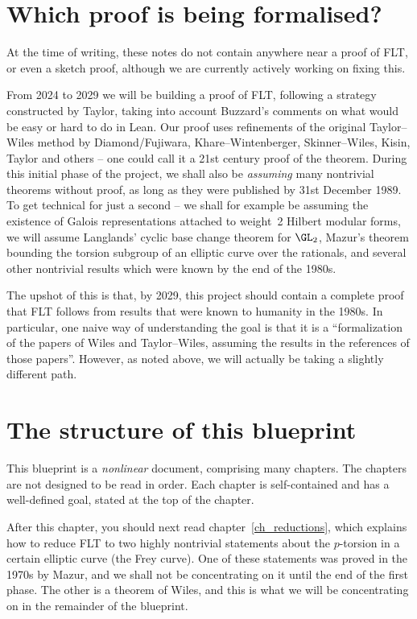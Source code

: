 \section{Which proof is being formalised?}

At the time of writing, these notes do not contain anywhere near a proof of FLT, or even a sketch proof,
although we are currently actively working on fixing this.

From 2024 to 2029 we will be building a proof of FLT, following a strategy
constructed by Taylor, taking into account Buzzard's comments on what would be easy or hard to do
in Lean. Our proof uses refinements of the original Taylor--Wiles method by Diamond/Fujiwara,
Khare--Wintenberger, Skinner--Wiles, Kisin, Taylor and others -- one could call it a 21st century
proof of the theorem. During this initial phase of the project, we shall also be \emph{assuming}
many nontrivial theorems without proof, as long as they were published by 31st December 1989.
To get technical for just a second -- we shall for example be assuming the existence of Galois
representations attached to weight~2 Hilbert modular forms, we will assume Langlands' cyclic base
change theorem for $\GL_2$, Mazur's theorem bounding the torsion subgroup of an elliptic curve over
the rationals, and several other nontrivial results which were known by the end of the 1980s.

The upshot of this is that, by 2029, this project should contain a complete proof that FLT
follows from results that were known to humanity in the 1980s. In particular, one naive
way of understanding the goal is that it is a ``formalization of the papers of Wiles and Taylor--Wiles,
assuming the results in the references of those papers''. However, as noted above, we will actually
be taking a slightly different path.

\section{The structure of this blueprint}

This blueprint is a \emph{nonlinear} document, comprising many chapters. The chapters
are not designed to be read in order. Each chapter is self-contained and has a well-defined goal,
stated at the top of the chapter.

After this chapter, you should next read chapter~\ref{ch_reductions}, which explains how to reduce FLT
to two highly nontrivial statements about the $p$-torsion in a certain elliptic curve (the Frey curve).
One of these statements was proved in the 1970s by Mazur, and we shall not be concentrating on
it until the end of the first phase. The other is a theorem of Wiles, and this is what we will
be concentrating on in the remainder of the blueprint.

